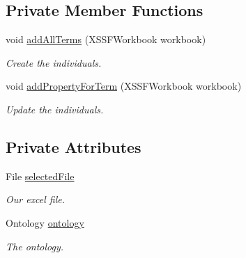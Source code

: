 \subsection*{Private Member Functions}
\begin{DoxyCompactItemize}
\item 
\hypertarget{class_excel_import_1_1_read_file_x_l_s_x_a50cc19d6c408d70fb81f5a06e7c5282c}{
void \hyperlink{class_excel_import_1_1_read_file_x_l_s_x_a50cc19d6c408d70fb81f5a06e7c5282c}{addAllTerms} (XSSFWorkbook workbook)}
\label{class_excel_import_1_1_read_file_x_l_s_x_a50cc19d6c408d70fb81f5a06e7c5282c}

\begin{DoxyCompactList}\small\item\em Create the individuals. \end{DoxyCompactList}\item 
\hypertarget{class_excel_import_1_1_read_file_x_l_s_x_a104ee29bb26756b5e4bf051243efdd3c}{
void \hyperlink{class_excel_import_1_1_read_file_x_l_s_x_a104ee29bb26756b5e4bf051243efdd3c}{addPropertyForTerm} (XSSFWorkbook workbook)}
\label{class_excel_import_1_1_read_file_x_l_s_x_a104ee29bb26756b5e4bf051243efdd3c}

\begin{DoxyCompactList}\small\item\em Update the individuals. \end{DoxyCompactList}\end{DoxyCompactItemize}
\subsection*{Private Attributes}
\begin{DoxyCompactItemize}
\item 
\hypertarget{class_excel_import_1_1_read_file_x_l_s_x_a96053b681904937c778d14c1a00024e2}{
File \hyperlink{class_excel_import_1_1_read_file_x_l_s_x_a96053b681904937c778d14c1a00024e2}{selectedFile}}
\label{class_excel_import_1_1_read_file_x_l_s_x_a96053b681904937c778d14c1a00024e2}

\begin{DoxyCompactList}\small\item\em Our excel file. \end{DoxyCompactList}\item 
\hypertarget{class_excel_import_1_1_read_file_x_l_s_x_a3d48bb5d76492f687e832a26a93d22ec}{
Ontology \hyperlink{class_excel_import_1_1_read_file_x_l_s_x_a3d48bb5d76492f687e832a26a93d22ec}{ontology}}
\label{class_excel_import_1_1_read_file_x_l_s_x_a3d48bb5d76492f687e832a26a93d22ec}

\begin{DoxyCompactList}\small\item\em The ontology. \end{DoxyCompactList}\end{DoxyCompactItemize}


